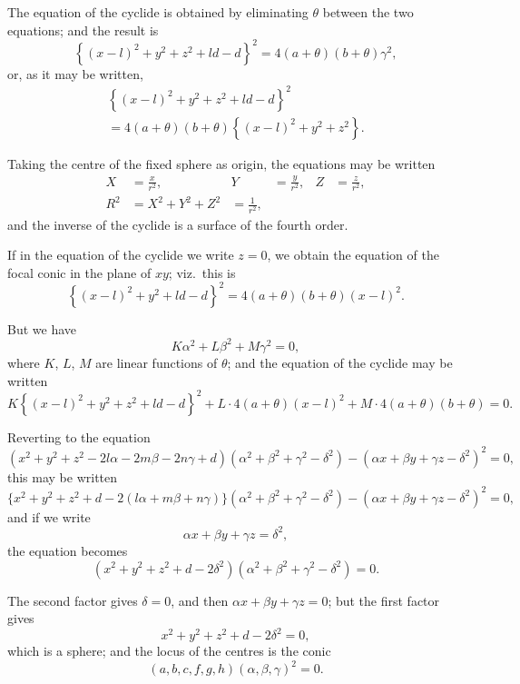 \documentclass[11pt,a4paper]{book}
\begin{document}
The equation of the cyclide is obtained by eliminating $\theta$ between the two equations; and the result is
\[
\left\{ (x - l)^2 + y^2 + z^2 + ld - d \right\}^2 = 4(a + \theta)(b + \theta)\gamma^2,
\]
or, as it may be written,
\begin{multline*}
\left\{ (x - l)^2 + y^2 + z^2 + ld - d \right\}^2 \\
= 4(a + \theta)(b + \theta) \left\{ (x - l)^2 + y^2 + z^2 \right\}.
\end{multline*}

\newpage

Taking the centre of the fixed sphere as origin, the equations may be written
\begin{align*}
X &= \frac{x}{r^2}, & Y &= \frac{y}{r^2}, & Z &= \frac{z}{r^2}, \\
R^2 &= X^2 + Y^2 + Z^2 &= \frac{1}{r^2},
\end{align*}
and the inverse of the cyclide is a surface of the fourth order.

If in the equation of the cyclide we write $z = 0$, we obtain the equation of the focal conic in the plane of $xy$; viz.\ this is
\[
\left\{ (x - l)^2 + y^2 + ld - d \right\}^2 = 4(a + \theta)(b + \theta)(x - l)^2.
\]

But we have
\[
K\alpha^2 + L\beta^2 + M\gamma^2 = 0,
\]
where $K$, $L$, $M$ are linear functions of $\theta$; and the equation of the cyclide may be written
\[
K\left\{ (x - l)^2 + y^2 + z^2 + ld - d \right\}^2 + L \cdot 4(a + \theta)(x - l)^2 + M \cdot 4(a + \theta)(b + \theta) = 0.
\]

\newpage

Reverting to the equation
\[
(x^2 + y^2 + z^2 - 2l\alpha - 2m\beta - 2n\gamma + d)(\alpha^2 + \beta^2 + \gamma^2 - \delta^2) - (\alpha x + \beta y + \gamma z - \delta^2)^2 = 0,
\]
this may be written
\[
\{x^2 + y^2 + z^2 + d - 2(l\alpha + m\beta + n\gamma)\}(\alpha^2 + \beta^2 + \gamma^2 - \delta^2) - (\alpha x + \beta y + \gamma z - \delta^2)^2 = 0,
\]
and if we write
\[
\alpha x + \beta y + \gamma z = \delta^2,
\]
the equation becomes
\[
(x^2 + y^2 + z^2 + d - 2\delta^2)(\alpha^2 + \beta^2 + \gamma^2 - \delta^2) = 0.
\]

The second factor gives $\delta = 0$, and then $\alpha x + \beta y + \gamma z = 0$; but the first factor gives
\[
x^2 + y^2 + z^2 + d - 2\delta^2 = 0,
\]
which is a sphere; and the locus of the centres is the conic
\[
(a, b, c, f, g, h)(\alpha, \beta, \gamma)^2 = 0.
\]

\newpage
\end{document}
